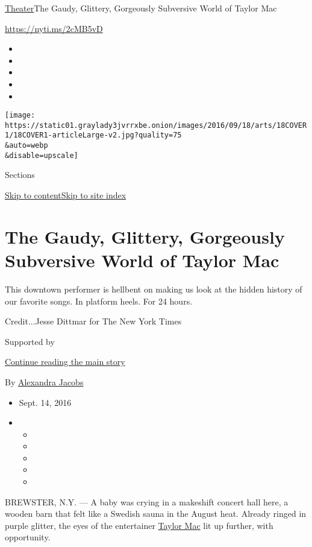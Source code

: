 \href{/section/theater}{Theater}\textbar{}The Gaudy, Glittery,
Gorgeously Subversive World of Taylor Mac

\url{https://nyti.ms/2cMB5vD}

\begin{itemize}
\item
\item
\item
\item
\item
\end{itemize}

\texttt{[image: https://static01.graylady3jvrrxbe.onion/images/2016/09/18/arts/18COVER1/18COVER1-articleLarge-v2.jpg?quality=75\\\&auto=webp\\\&disable=upscale]}

Sections

\protect\hyperlink{site-content}{Skip to
content}\protect\hyperlink{site-index}{Skip to site index}

\hypertarget{the-gaudy-glittery-gorgeously-subversive-world-of-taylor-mac}{%
\section{The Gaudy, Glittery, Gorgeously Subversive World of Taylor
Mac}\label{the-gaudy-glittery-gorgeously-subversive-world-of-taylor-mac}}

This downtown performer is hellbent on making us look at the hidden
history of our favorite songs. In platform heels. For 24 hours.

Credit...Jesse Dittmar for The New York Times

Supported by

\protect\hyperlink{after-sponsor}{Continue reading the main story}

By
\href{https://www.nytimes3xbfgragh.onion/by/alexandra-jacobs}{Alexandra
Jacobs}

\begin{itemize}
\item
  Sept. 14, 2016
\item
  \begin{itemize}
  \item
  \item
  \item
  \item
  \item
  \end{itemize}
\end{itemize}

BREWSTER, N.Y. --- A baby was crying in a makeshift concert hall here, a
wooden barn that felt like a Swedish sauna in the August heat. Already
ringed in purple glitter, the eyes of the entertainer
\href{http://www.taylormac.org/}{Taylor Mac} lit up further, with
opportunity.


